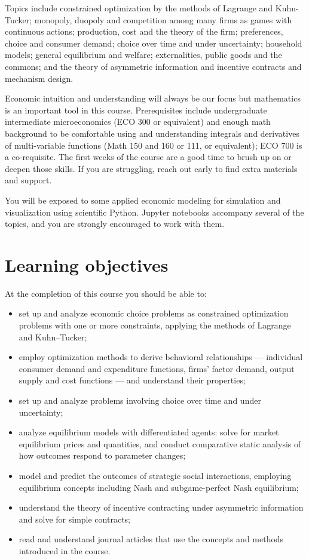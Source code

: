 \documentclass[11pt]{article}
\begin{document}
Topics include constrained optimization by the methods of Lagrange and
Kuhn-Tucker; monopoly, duopoly and competition among many firms as games with
continuous actions; production, cost and the theory of the firm; preferences,
choice and consumer demand; choice over time and under uncertainty; household
models; general equilibrium and welfare; externalities, public goods and the
commons; and the theory of asymmetric information and incentive contracts and mechanism design.

Economic intuition and understanding will always be our focus but mathematics is
an important tool in this course. Prerequisites include undergraduate
intermediate microeconomics (ECO 300 or equivalent) and enough math background
to be comfortable using and understanding integrals and derivatives of
multi-variable functions (Math 150 and 160 or 111, or equivalent); ECO 700 is a
co-requisite. The first weeks of the course are a good time to brush up on or
deepen those skills. If you are struggling, reach out early to find extra
materials and support.

You will be exposed to some applied economic modeling for simulation and
visualization using scientific Python. Jupyter notebooks accompany several of
the topics, and you are strongly encouraged to work with them.

\newpage

\section{Learning objectives}
At the completion of this course you should be able to:\vspace*{-12pt}
\begin{itemize}
\item set up and analyze economic choice problems as constrained optimization problems with one or more constraints, applying the methods of Lagrange and Kuhn--Tucker;
\item employ optimization methods to derive behavioral relationships --- individual consumer demand and expenditure functions, firms' factor demand, output supply and cost functions --- and understand their properties;
\item set up and analyze problems involving choice over time and under uncertainty;
\item analyze equilibrium models with differentiated agents: solve for market equilibrium prices and quantities, and conduct comparative static analysis of how outcomes respond to parameter changes;
\item model and predict the outcomes of strategic social interactions, employing equilibrium concepts including Nash and subgame-perfect Nash equilibrium;
\item understand the theory of incentive contracting under asymmetric information and solve for simple contracts;
\item read and understand journal articles that use the concepts and methods introduced in the course.
\end{itemize}
\end{document}
